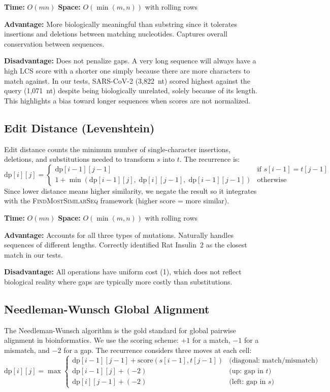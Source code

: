 \documentclass{article}
\begin{document}
\textbf{Time:} $O(mn)$ \quad \textbf{Space:} $O(\min(m, n))$ with rolling rows

\textbf{Advantage:} More biologically meaningful than substring since it tolerates insertions and deletions between matching nucleotides. Captures overall conservation between sequences.

\textbf{Disadvantage:} Does not penalize gaps. A very long sequence will always have a high LCS score with a shorter one simply because there are more characters to match against. In our tests, SARS-CoV-2 (3,822~nt) scored highest against the query (1,071~nt) despite being biologically unrelated, solely because of its length. This highlights a bias toward longer sequences when scores are not normalized.

\subsection{Edit Distance (Levenshtein)}

Edit distance counts the minimum number of single-character insertions, deletions, and substitutions needed to transform $s$ into $t$. The recurrence is:
\[
\text{dp}[i][j] = 
\begin{cases}
\text{dp}[i{-}1][j{-}1] & \text{if } s[i{-}1] = t[j{-}1] \\
1 + \min(\text{dp}[i{-}1][j],\; \text{dp}[i][j{-}1],\; \text{dp}[i{-}1][j{-}1]) & \text{otherwise}
\end{cases}
\]
Since lower distance means higher similarity, we negate the result so it integrates with the \textsc{FindMostSimilarSeq} framework (higher score = more similar).

\textbf{Time:} $O(mn)$ \quad \textbf{Space:} $O(\min(m, n))$ with rolling rows

\textbf{Advantage:} Accounts for all three types of mutations. Naturally handles sequences of different lengths. Correctly identified Rat Insulin~2 as the closest match in our tests.

\textbf{Disadvantage:} All operations have uniform cost (1), which does not reflect biological reality where gaps are typically more costly than substitutions.

\subsection{Needleman-Wunsch Global Alignment}

The Needleman-Wunsch algorithm is the gold standard for global pairwise alignment in bioinformatics. We use the scoring scheme: $+1$ for a match, $-1$ for a mismatch, and $-2$ for a gap. The recurrence considers three moves at each cell:
\[
\text{dp}[i][j] = \max
\begin{cases}
\text{dp}[i{-}1][j{-}1] + \text{score}(s[i{-}1], t[j{-}1]) & \text{(diagonal: match/mismatch)} \\
\text{dp}[i{-}1][j] + (-2) & \text{(up: gap in } t\text{)} \\
\text{dp}[i][j{-}1] + (-2) & \text{(left: gap in } s\text{)}
\end{cases}
\]
\end{document}
